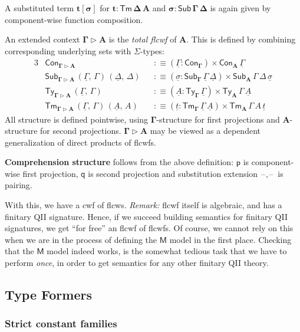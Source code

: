 \documentclass[12pt,a4paper,twoside,openany]{book}
\theoremstyle{remark}
\theoremstyle{definition}
\theoremstyle{theorem}
\newcommand{\bs}[1]{\boldsymbol{#1}}
\newcommand{\Con}{\mathsf{Con}}
\newcommand{\Sub}{\mathsf{Sub}}
\newcommand{\Tm}{\mathsf{Tm}}
\newcommand{\Ty}{\mathsf{Ty}}
\newcommand{\blank}{\mathord{\hspace{1pt}\text{--}\hspace{1pt}}}
\newcommand{\ext}{\triangleright}
\newcommand{\p}{\mathsf{p}}
\newcommand{\q}{\mathsf{q}}
\newcommand{\bGamma}{\bs{\Gamma}}
\newcommand{\bA}{\bs{A}}
\newcommand{\bM}{\bs{\mathsf{M}}}
\newcommand{\ul}[1]{\underline{#1}}
\newcommand{\ulGamma}{\ul{\Gamma}}
\newcommand{\ulDelta}{\ul{\Delta}}
\newcommand{\ulsigma}{\ul{\sigma}}
\newcommand{\ult}{\ul{t}}
\newcommand{\ulA}{\ul{A}}
\newcommand{\defn}{:\equiv}
\begin{document}
A substituted term $\bs{t[\sigma]}$ for $\bs{t : \Tm\,\Delta\,A}$ and
$\bs{\sigma : \Sub\,\Gamma\,\Delta}$ is again given by component-wise function
composition.

An extended context $\bs{\Gamma \ext A}$ is the \emph{total flcwf} of
$\bA$. This is defined by combining corresponding underlying sets with
$\Sigma$-types:
\begin{alignat*}{3}
  & \Con_{\bs{\Gamma \ext A}} &&\defn (\ulGamma : \Con_{\bGamma}) \times \Con_{\bA}\,\ulGamma\\
  & \Sub_{\bs{\Gamma \ext A}}\,(\ulGamma,\,\Gamma)\,(\ulDelta,\,\Delta) &&\defn (\ulsigma : \Sub_{\bGamma}\,\ulGamma\,\ulDelta) \times \Sub_{\bA}\,\Gamma\,\Delta\,\ulsigma\\
  & \Ty_{\bs{\Gamma \ext A}}\,(\ulGamma,\,\Gamma) &&\defn (\ulA : \Ty_{\bGamma}\,\ulGamma) \times \Ty_{\bA}\,\Gamma\,\ulA\\
  & \Tm_{\bs{\Gamma \ext A}}\,(\ulGamma,\,\Gamma)\,(\ulA,\,A) &&\defn (\ult : \Tm_{\bGamma}\,\ulGamma\,\ulA) \times \Tm_{\bA}\,\Gamma\,A\,\ult
\end{alignat*}
All structure is defined pointwise, using $\bGamma$-structure for first
projections and $\bA$-structure for second projections. $\bs{\Gamma \ext A}$ may
be viewed as a dependent generalization of direct products of flcwfs.

\textbf{Comprehension structure} follows from the above definition: $\bs{\p}$ is
component-wise first projection, $\bs{\q}$ is second projection and substitution
extension $\bs{\blank,\blank}$ is pairing.

With this, we have a cwf of flcws. \emph{Remark:} flcwf itself is algebraic, and
has a finitary QII signature. Hence, if we succeed building semantics for
finitary QII signatures, we get ``for free'' an flcwf of flcwfs. Of course, we
cannot rely on this when we are in the process of defining the $\bM$ model in the
first place. Checking that the $\bM$ model indeed works, is the somewhat tedious
task that we have to perform \emph{once}, in order to get semantics for any
other finitary QII theory.

\subsection{Type Formers}

\subsubsection{Strict constant families}
\end{document}
